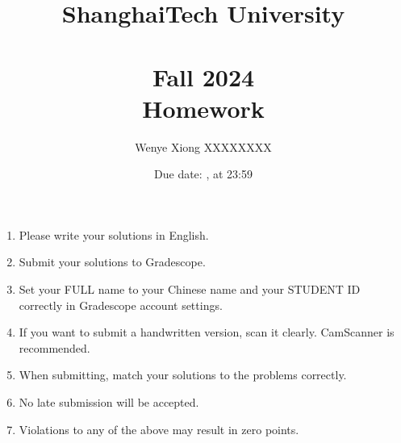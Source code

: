 \documentclass[11pt, addpoints, answers]{exam}
\title{
    \vspace{25pt}
    \LARGE ShanghaiTech University \\
    \bigskip
    \textbf{\CourseName} \\
    \textbf{Fall 2024}   \\
    \bigskip
    Homework \HomeworkNO
}
\author{Wenye Xiong XXXXXXXX}
\date{Due date: \DueDate, at 23:59}
\begin{document}
\maketitle

\vspace{50pt}

\begin{enumerate}
    \item Please write your solutions in English.
    \item Submit your solutions to Gradescope.
    \item Set your FULL name to your Chinese name and your STUDENT ID correctly in Gradescope account settings.
    \item If you want to submit a handwritten version, scan it clearly. CamScanner is recommended.
    \item When submitting, match your solutions to the problems correctly.
    \item No late submission will be accepted.
    \item Violations to any of the above may result in zero points.
\end{enumerate}

\newpage

\begin{questions}











\end{questions}
\end{document}
